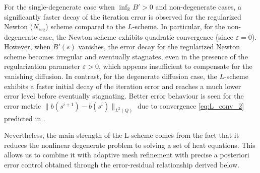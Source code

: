 \documentclass[review,11pt]{article}
\numberwithin{equation}{section}
\def \e  {\varepsilon}
\begin{document}
For the single-degenerate case when $\inf_{\mathbb{R}} B'>0$ and non-degenerate cases, a significantly faster decay of the iteration error is observed for the regularized Newton ($N_{\mathrm{reg}}$) scheme compared to the \(L\)-scheme. In particular, for the non-degenerate case, the Newton scheme exhibits quadratic convergence (since $\e=0$). However, when \(B'(s)\) vanishes, the error decay for the regularized Newton scheme becomes irregular and eventually stagnates, even in the presence of the regularization parameter \(\e>0\), which appears insufficient to compensate for the vanishing diffusion. In contrast, for the degenerate diffusion case, the \(L\)-scheme exhibits a faster initial decay of the iteration error and reaches a much lower error level before eventually stagnating. Better error behaviour is seen for the error metric  $\|b(s^{i+1})-b(s^i)\|_{L^2(Q)}$ due to convergence \eqref{eq:L_conv_2} predicted in .

Nevertheless, the main strength of the L-scheme comes from the fact that it reduces the nonlinear degenerate problem to solving a set of heat equations. This allows us to combine it with adaptive mesh refinement with precise a posteriori error control obtained through the error-residual relationship derived below.




   
\end{document}
